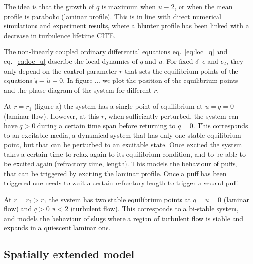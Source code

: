 \documentclass{article}
\begin{document}
The idea is that the growth of $q$ is maximum when $u \equiv  2$, or when the mean profile is parabolic (laminar profile). This is in line with direct numerical simulations and experiment results, where a blunter profile has been linked with a decrease in turbulence lifetime CITE.

The non-linearly coupled ordinary differential equations eq.~\ref{eq:loc_q} and eq.~\ref{eq:loc_u} describe the local dynamics of $q$ and $u$. For fixed $\delta$, $\epsilon$ and $\epsilon_{2}$, they only depend on the control parameter $r$ that sets the equilibrium points of the equations $\dot{q}=\dot{u}=0$. In figure ... we plot the position of the equilibrium points and the phase diagram of the system for different $r$. 

At $r=r_{1}$ (figure a) the system has a single point of equilibrium at $u=q=0$ (laminar flow). However, at this $r$, when sufficiently perturbed, the system can have $q>0$ during a certain time span before returning to $q=0$. This corresponds to an excitable media, a dynamical system that has only one stable equilibrium point, but that can be perturbed to an excitable state. Once excited the system takes a certain time to relax again to its equilibrium condition, and to be able to be excited again (refractory time, length). This models the behaviour of puffs, that can be triggered by exciting the laminar profile. Once a puff has been triggered one needs to wait a certain refractory length to trigger a second puff. 

At $r=r_{2}>r_{1}$ the system has two stable equilibrium points at $q=u=0$ (laminar flow) and $q>0$ $u<2$ (turbulent flow). This corresponds to a bi-stable system, and models the behaviour of slugs where a region of turbulent flow is stable and expands in a quiescent laminar one. 

\subsection{Spatially extended model}





















\end{document}
